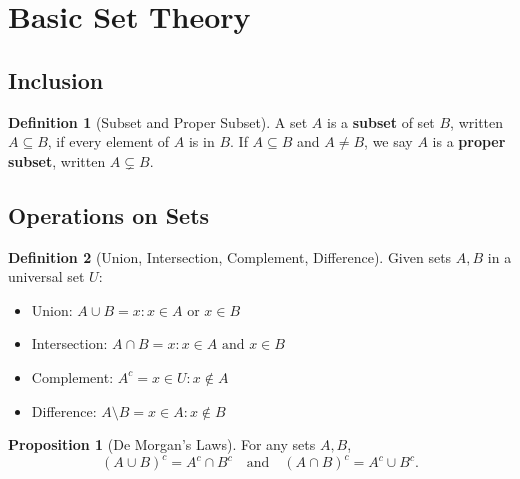 \documentclass[12pt]{article}
\title{}
\author{Jerich Lee}
\date{\today}
\theoremstyle{definition} %
\newtheorem{proposition}{Proposition}
\newtheorem{definition}{Definition}
\theoremstyle{plain} %
\begin{document}
\maketitle

\section{Basic Set Theory}

\subsection{Inclusion}
\begin{definition}[Subset and Proper Subset]
A set \(A\) is a \textbf{subset} of set \(B\), written \(A \subseteq B\), if every element of \(A\) is in \(B\). If \(A \subseteq B\) and \(A \neq B\), we say \(A\) is a \textbf{proper subset}, written \(A \subsetneq B\).
\end{definition}

\subsection{Operations on Sets}
\begin{definition}[Union, Intersection, Complement, Difference]
Given sets \(A,B\) in a universal set \(U\):
\begin{itemize}
\item Union: \(A \cup B = {x: x \in A \text{ or } x \in B}\)
\item Intersection: \(A \cap B = {x: x \in A \text{ and } x \in B}\)
\item Complement: \(A^c = {x \in U: x \notin A}\)
\item Difference: \(A \setminus B = {x \in A: x \notin B}\)
\end{itemize}
\end{definition}

\begin{proposition}[De Morgan's Laws]
        For any sets \(A,B\),
        \[
        (A \cup B)^c = A^c \cap B^c \quad\text{and}\quad (A \cap B)^c = A^c \cup B^c.
        \]
        \end{proposition}
\end{document}
